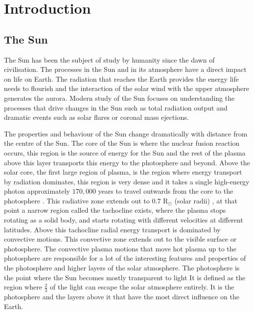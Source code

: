 \documentclass[a4paper,12pt,fourier,authoryear,custommargin]{Classes/PhDThesisPSnPDF}
\begin{document}
\chapter{Introduction}  %


\section{The Sun} %
The Sun has been the subject of study by humanity since the dawn of civilisation.
The processes in the Sun and in its atmosphere have a direct impact on life on Earth.
The radiation that reaches the Earth provides the energy life needs to flourish and the interaction of the solar wind with the upper atmosphere generates the aurora.
Modern study of the Sun focuses on understanding the processes that drive changes in the Sun such as total radiation output and dramatic events such as solar flares or coronal mass ejections.

The properties and behaviour of the Sun change dramatically with distance from the centre of the Sun.
The core of the Sun is where the nuclear fusion reaction occurs, this region is the source of energy for the Sun and the rest of the plasma above this layer transports this energy to the photosphere and beyond.
Above the solar core, the first large region of plasma, is the region where energy transport by radiation dominates, this region is very dense and it takes a single high-energy photon approximately $170,000$ years to travel outwards from the core to the photosphere \citep{priest2014}.
This radiative zone extends out to $0.7$ R$_\odot$ (solar radii) \citep{priest2014}, at that point a narrow region called the tachocline exists, where the plasma stops rotating as a solid body, and starts rotating with different velocities at different latitudes.
Above this tachocline radial energy transport is dominated by convective motions.
This convective zone extends out to the visible surface or photosphere.
The convective plasma motions that move hot plasma up to the photosphere are responsible for a lot of the interesting features and properties of the photosphere and higher layers of the solar atmosphere.
The photosphere is the point where the Sun becomes mostly transparent to light
It is defined as the region where $\frac{2}{3}$ of the light can escape the solar atmosphere entirely.
It is the photosphere and the layers above it that have the most direct influence on the Earth.
\end{document}
